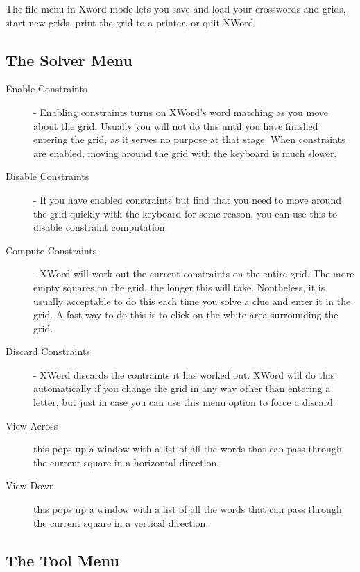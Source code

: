 The file menu in Xword mode lets you save and load your crosswords
and grids, start new grids, print the grid to a printer, or quit XWord. 

\subsection{The Solver Menu}

\begin{description}
\item [Enable Constraints] - Enabling constraints turns on XWord's
word matching as you move about the grid. Usually you will not do
this until you have finished entering the grid, as it serves no
purpose at that stage. When constraints are enabled, moving around
the grid with the keyboard is much slower.
\item [Disable Constraints] - If you have enabled constraints but 
find that you need to move around the grid quickly with the keyboard
for some reason, you can use this to disable constraint computation.
\item [Compute Constraints] - XWord will work out the current 
constraints on the entire grid. The more empty squares on the grid,
the longer this will take. Nontheless, it is usually acceptable to
do this each time you solve a clue and enter it in the grid. A
fast way to do this is to click on the white area surrounding the
grid.
\item [Discard Constraints] - XWord discards the contraints it
has worked out. XWord will do this automatically if you change 
the grid in any way other than entering a letter, but just in case
you can use this menu option to force a discard.
\item [View Across] this pops up a window with a list of all the
words that can pass through the current square in a horizontal
direction.
\item [View Down] this pops up a window with a list of all the
words that can pass through the current square in a vertical
direction.
\end{description}

\subsection{The Tool Menu}

